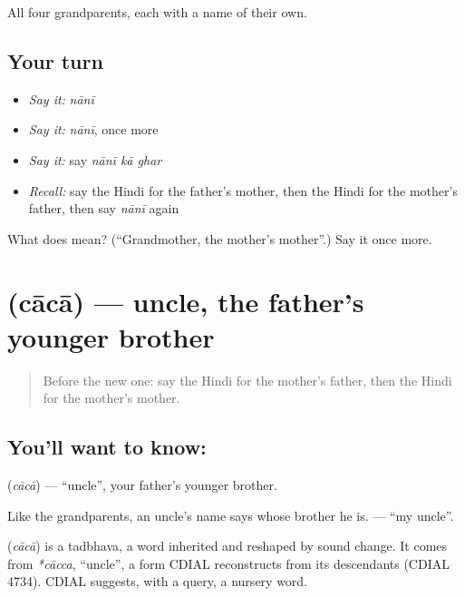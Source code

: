 \begin{grammarlens}[title={What you've built}]
All four grandparents, each with a name of their own.
\end{grammarlens}

\subsection*{Your turn}
\begin{itemize}
\raggedright
  \item \emph{Say it:} \emph{nānī}
  \item \emph{Say it:} \emph{nānī}, once more
  \item \emph{Say it:} say \emph{nānī kā ghar}
  \item \emph{Recall:} say the Hindi for the father's mother, then the Hindi for the mother's father, then say \emph{nānī} again
\end{itemize}

\begin{tcolorbox}[breakable,colback=teal!4,colframe=teal!35!black,title={Before you move on}]
What does  mean? (\textquotedblleft{}Grandmother, the mother's mother\textquotedblright{}.) Say it once more.
\end{tcolorbox}
\section[\texorpdfstring{\hi{चाचा} (cācā)}{चाचा (cācā)}]{ (cācā) — uncle, the father's younger brother}

\label{lesson:HI-C116-chacha}



\begin{quote}
Before the new one: say the Hindi for the mother's father, then the Hindi for the mother's mother.
\end{quote}

\subsection*{You'll want to know: }
\textbf{} (\emph{cācā}) — \textquotedblleft{}uncle\textquotedblright{}, your father's younger brother.

Like the grandparents, an uncle's name says whose brother he is. \textbf{ } — \textquotedblleft{}my uncle\textquotedblright{}.

\begin{cousinweb}
\textbf{} (\emph{cācā}) is a tadbhava, a word inherited and reshaped by sound change. It comes from \emph{*cācca}, \textquotedblleft{}uncle\textquotedblright{}, a form CDIAL reconstructs from its descendants (CDIAL 4734). CDIAL suggests, with a query, a nursery word.
\end{cousinweb}


